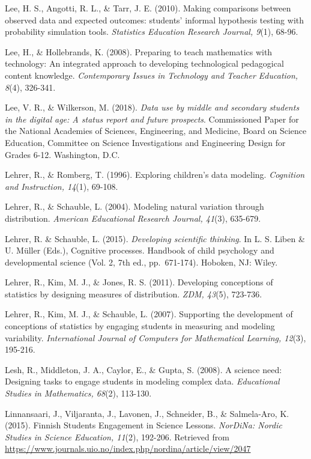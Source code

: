\documentclass[]{msu-thesis}
\theoremstyle{definition}
\theoremstyle{definition}
\theoremstyle{definition}
\theoremstyle{remark}
\begin{document}
Lee, H. S., Angotti, R. L., \& Tarr, J. E. (2010). Making comparisons
between observed data and expected outcomes: students' informal
hypothesis testing with probability simulation tools. \emph{Statistics
Education Research Journal, 9}(1), 68-96.

Lee, H., \& Hollebrands, K. (2008). Preparing to teach mathematics with
technology: An integrated approach to developing technological
pedagogical content knowledge. \emph{Contemporary Issues in Technology
and Teacher Education, 8}(4), 326-341.

Lee, V. R., \& Wilkerson, M. (2018). \emph{Data use by middle and
secondary students in the digital age: A status report and future
prospects}. Commissioned Paper for the National Academies of Sciences,
Engineering, and Medicine, Board on Science Education, Committee on
Science Investigations and Engineering Design for Grades 6-12.
Washington, D.C.

Lehrer, R., \& Romberg, T. (1996). Exploring children's data modeling.
\emph{Cognition and Instruction, 14}(1), 69-108.

Lehrer, R., \& Schauble, L. (2004). Modeling natural variation through
distribution. \emph{American Educational Research Journal, 41}(3),
635-679.

Lehrer, R. \& Schauble, L. (2015). \emph{Developing scientific
thinking}. In L. S. Liben \& U. Müller (Eds.), Cognitive processes.
Handbook of child psychology and developmental science (Vol. 2, 7th ed.,
pp.~671-174). Hoboken, NJ: Wiley.

Lehrer, R., Kim, M. J., \& Jones, R. S. (2011). Developing conceptions
of statistics by designing measures of distribution. \emph{ZDM, 43}(5),
723-736.

Lehrer, R., Kim, M. J., \& Schauble, L. (2007). Supporting the
development of conceptions of statistics by engaging students in
measuring and modeling variability. \emph{International Journal of
Computers for Mathematical Learning, 12}(3), 195-216.

Lesh, R., Middleton, J. A., Caylor, E., \& Gupta, S. (2008). A science
need: Designing tasks to engage students in modeling complex data.
\emph{Educational Studies in Mathematics, 68}(2), 113-130.

Linnansaari, J., Viljaranta, J., Lavonen, J., Schneider, B., \&
Salmela-Aro, K. (2015). Finnish Students Engagement in Science Lessons.
\emph{NorDiNa: Nordic Studies in Science Education, 11}(2), 192-206.
Retrieved from
\url{https://www.journals.uio.no/index.php/nordina/article/view/2047}
\end{document}
